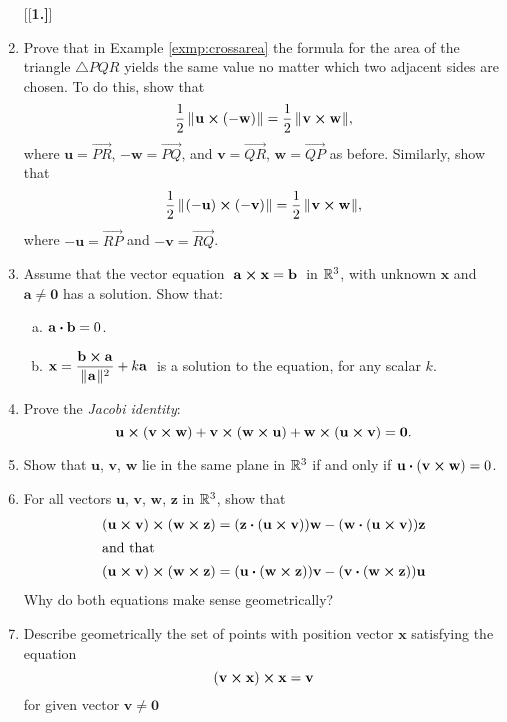 \begin{enumerate}[\bfseries 1.]
[{[\bfseries 1.]}]
\item
Prove that in Example \ref{exmp:crossarea} the formula for the area of the triangle $\triangle PQR$ 
yields the same value no matter which two adjacent sides are chosen. 
To do this, show that
\[\frac{1}{2}\,\lVert\mspace{1mu}\mathbf{u} \bm{\times} (-\mathbf{w})\mspace{1mu}\rVert = \frac{1}{2}\,\lVert\mspace{1mu}\mathbf{v} \bm{\times} \mathbf{w}\mspace{1mu}\rVert,\]
where 
$\mathbf{u} = \overrightarrow{PR}$, 
$-\mathbf{w} = \overrightarrow{PQ}$, 
and $\mathbf{v} = \overrightarrow{QR}$, 
$\mathbf{w} = \overrightarrow{QP}$ as before. 
Similarly, show that
\[\frac{1}{2}\,\lVert\mspace{1mu}(-\mathbf{u}) \bm{\times} (-\mathbf{v})\mspace{1mu}\rVert =
  \frac{1}{2}\,\lVert\mspace{1mu}\mathbf{v} \bm{\times} \mathbf{w}\mspace{1mu}\rVert,\] 
where 
$-\mathbf{u} = \overrightarrow{RP}$ 
and $-\mathbf{v} = \overrightarrow{RQ}$.
\item 
Assume that the vector equation $\thickspace\mathbf{a} \bm{\times} \mathbf{x} = \mathbf{b}\thickspace$ in $\mathbb{R}^{3}$, 
with unknown $\mathbf{x}$ and $\mathbf{a} \ne \mathbf{0}$ has a solution.
Show that:
  \begin{enumerate}[(a)]
   \item $\mathbf{a} \bm{\cdot} \mathbf{b} = 0$.
   \item $\mathbf{x} = \dfrac{\mathbf{b} \bm{\times} \mathbf{a}}{\lVert\mspace{1mu}\mathbf{a}\mspace{1mu}\rVert^2} + k \mathbf{a}\thickspace$
   is a solution to the equation, for any scalar $k$.
  \end{enumerate}
 \item Prove the \emph{Jacobi identity}:
  \[\mathbf{u} \bm{\times} (\mathbf{v} \bm{\times} \mathbf{w}) +
  \mathbf{v} \bm{\times} (\mathbf{w} \bm{\times} \mathbf{u}) +
  \mathbf{w} \bm{\times} (\mathbf{u} \bm{\times} \mathbf{v}) = \mathbf{0}.\]
 \item Show that $\mathbf{u}$, $\mathbf{v}$, $\mathbf{w}$ lie in the same plane in $\mathbb{R}^{3}$ if and only if
  $\mathbf{u} \bm{\cdot} (\mathbf{v} \bm{\times} \mathbf{w}) = 0$.
 \item For all vectors $\mathbf{u}$, $\mathbf{v}$, $\mathbf{w}$, $\mathbf{z}$ in $\mathbb{R}^{3}$, show that
  \begin{align*}
   (\mathbf{u} \bm{\times} \mathbf{v}) \bm{\times} (\mathbf{w} \bm{\times} \mathbf{z}) &=
    (\mathbf{z} \bm{\cdot} (\mathbf{u} \bm{\times} \mathbf{v}))\mathbf{w} -
    (\mathbf{w} \bm{\cdot} (\mathbf{u} \bm{\times} \mathbf{v}))\mathbf{z}\\
   \intertext{and that}
   (\mathbf{u} \bm{\times} \mathbf{v}) \bm{\times} (\mathbf{w} \bm{\times} \mathbf{z}) &=
    (\mathbf{u} \bm{\cdot} (\mathbf{w} \bm{\times} \mathbf{z}))\mathbf{v} -
    (\mathbf{v} \bm{\cdot} (\mathbf{w} \bm{\times} \mathbf{z}))\mathbf{u}
  \end{align*}
  Why do both equations make sense geometrically?

\item Describe geometrically the set of points with position vector $\mathbf{x}$ satisfying the equation 
\[(\mathbf{v} \bm{\times} \mathbf{x}) \bm{\times} \mathbf{x}=\mathbf{v}\]
for given vector $\mathbf{v}\ne \mathbf{0}$
\end{enumerate}


